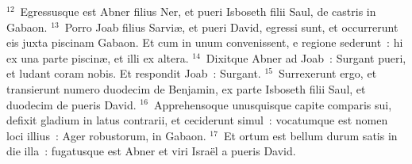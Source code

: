${}^{12}$~Egressusque est Abner filius Ner, et pueri Isboseth filii Saul, de castris in Gabaon.
${}^{13}$~Porro Joab filius Sarvi\ae , et pueri David, egressi sunt, et occurrerunt eis juxta piscinam Gabaon. Et cum in unum convenissent, e regione sederunt~: hi ex una parte piscin\ae , et illi ex altera.
${}^{14}$~Dixitque Abner ad Joab~: Surgant pueri, et ludant coram nobis. Et respondit Joab~: Surgant.
${}^{15}$~Surrexerunt ergo, et transierunt numero duodecim de Benjamin, ex parte Isboseth filii Saul, et duodecim de pueris David.
${}^{16}$~Apprehensoque unusquisque capite comparis sui, defixit gladium in latus contrarii, et ceciderunt simul~: vocatumque est nomen loci illius~: Ager robustorum, in Gabaon.
${}^{17}$~Et ortum est bellum durum satis in die illa~: fugatusque est Abner et viri Isra\"el a pueris David.



